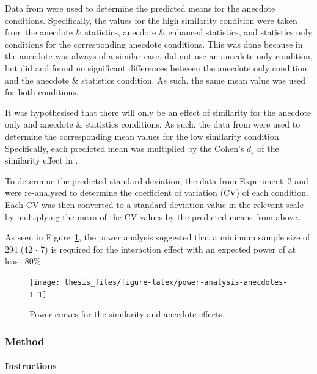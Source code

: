 \documentclass[a4paper, nobind, dvipsnames]{templates/ociamthesis}
\theoremstyle{definition}
\theoremstyle{definition}
\theoremstyle{definition}
\theoremstyle{definition}
\theoremstyle{remark}
\begin{document}
Data from \textcite{wainberg2018} were used to determine the predicted means for the
anecdote conditions. Specifically, the values for the high similarity condition
were taken from the anecdote \& statistics, anecdote \& enhanced statistics, and
statistics only conditions for the corresponding anecdote conditions. This was
done because in \textcite{wainberg2018} the anecdote was always of a similar case.
\textcite{wainberg2018} did not use an anecdote only condition, but \textcite{wainberg2013} did and
found no significant differences between the anecdote only condition and the
anecdote \& statistics condition. As such, the same mean value was used for both
conditions.

It was hypothesised that there will only be an effect of similarity for the
anecdote only and anecdote \& statistics conditions. As such, the data from
\textcite[Study 3]{hoeken2009} were used to determine the corresponding mean values for
the low similarity condition. Specifically, each predicted mean was multiplied
by the Cohen's \(d_z\) of the similarity effect in \textcite[Study 3]{hoeken2009}.

To determine the predicted standard deviation, the data from \textcite{jaramillo2019} \protect\hyperlink{anecdotes-2-appendix}{Experiment~2} and \textcite[Study 3]{hoeken2009} were re-analysed to determine the
coefficient of variation (CV) of each condition. Each CV was then converted to a
standard deviation value in the relevant scale by multiplying the mean of the CV
values by the predicted means from above.

As seen in Figure~\ref{fig:power-analysis-anecdotes-1}, the power analysis
suggested that a minimum sample size of 294
(42 \(\cdot\) 7) is required for the interaction effect with
an expected power of at least 80\%.



\begin{figure}
\texttt{[image: thesis\_files/figure-latex/power-analysis-anecdotes-1-1]} \caption{Power curves for the similarity and anecdote effects.}\label{fig:power-analysis-anecdotes-1}
\end{figure}

\subsubsection{Method}

\hypertarget{instructions-materials-anecdotes-1-appendix}{%
\paragraph{Instructions}\label{instructions-materials-anecdotes-1-appendix}}
\end{document}
